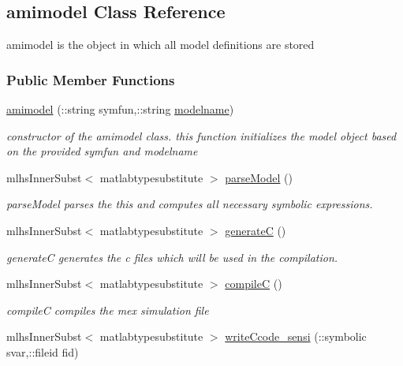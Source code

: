 \hypertarget{classamimodel}{}\subsection{amimodel Class Reference}
\label{classamimodel}


amimodel is the object in which all model definitions are stored  


\subsubsection*{Public Member Functions}
\begin{DoxyCompactItemize}
\item 
\hyperlink{classamimodel_a05d52506788717b3d482845748446a60}{amimodel} (\+::string symfun,\+::string \hyperlink{classamimodel_a71bca9c21a6de42d8079ade31cb61044}{modelname})
\begin{DoxyCompactList}\small\item\em constructor of the amimodel class. this function initializes the model object based on the provided symfun and modelname \end{DoxyCompactList}\item 
mlhs\+Inner\+Subst$<$ matlabtypesubstitute $>$ \hyperlink{classamimodel_a68efdc6ed5d618672bea1556209e5568}{parse\+Model} ()
\begin{DoxyCompactList}\small\item\em parse\+Model parses the this and computes all necessary symbolic expressions. \end{DoxyCompactList}\item 
mlhs\+Inner\+Subst$<$ matlabtypesubstitute $>$ \hyperlink{classamimodel_af2ce5001c2320c95471ecb8c3d73bdbb}{generate\+C} ()
\begin{DoxyCompactList}\small\item\em generate\+C generates the c files which will be used in the compilation. \end{DoxyCompactList}\item 
mlhs\+Inner\+Subst$<$ matlabtypesubstitute $>$ \hyperlink{classamimodel_ad1339463ebc3a2e6c6aeda6f63f1b4ed}{compile\+C} ()
\begin{DoxyCompactList}\small\item\em compile\+C compiles the mex simulation file \end{DoxyCompactList}\item 
mlhs\+Inner\+Subst$<$ matlabtypesubstitute $>$ \hyperlink{classamimodel_a65b30e6d951ff694d40d45b0625742c7}{write\+Ccode\+\_\+sensi} (\+::symbolic svar,\+::fileid fid)

\end{DoxyCompactItemize}
